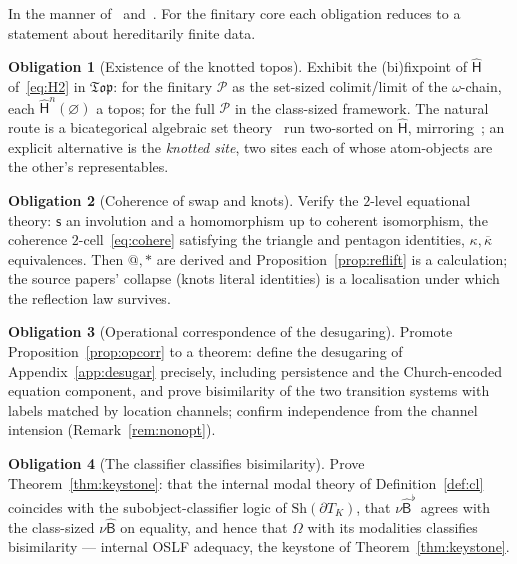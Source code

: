\documentclass[11pt]{article}
\makeatletter
\newcommand{\dT}{\partial T}
\newcommand{\Top}{\mathfrak{Top}}
\newcommand{\Sh}{\mathrm{Sh}}
\newcommand{\Ps}{\mathcal{P}}
\newcommand{\sH}{\widehat{\mathsf{H}}}
\newcommand{\sB}{\widehat{\mathsf{B}}}
\newcommand{\swap}{\mathsf{s}}
\newcommand{\Av}{\Omega}
\newcommand{\quo}[1]{@#1}
\newcommand{\drf}[1]{{*}#1}
\theoremstyle{plain}
\theoremstyle{definition}
\newtheorem{obligation}{Obligation}
\theoremstyle{remark}
\makeatother
\begin{document}
In the manner of~\cite[\S8]{rset} and~\cite[\S8]{knotrho}. For the finitary core each obligation
reduces to a statement about hereditarily finite data.

\begin{obligation}[Existence of the knotted topos]\label{ob:exist}
Exhibit the (bi)fixpoint of $\sH$ of~\eqref{eq:H2} in $\Top$: for the finitary $\Ps$ as the set-sized
colimit/limit of the $\omega$-chain, each $\sH^n(\varnothing)$ a topos; for the full $\Ps$ in the
class-sized framework. The natural route is a bicategorical algebraic set theory~\cite{jm,awodey,elephant}
run two-sorted on $\sH$, mirroring~\cite[\S8.1]{rset}; an explicit alternative is the \emph{knotted
site}, two sites each of whose atom-objects are the other's representables.
\end{obligation}

\begin{obligation}[Coherence of swap and knots]\label{ob:cohere}
Verify the $2$-level equational theory: $\swap$ an involution and a homomorphism up to coherent
isomorphism, the coherence $2$-cell~\eqref{eq:cohere} satisfying the triangle and pentagon identities,
$\kappa,\overline\kappa$ equivalences. Then $\quo{},\drf{}$ are derived and Proposition~\ref{prop:reflift}
is a calculation; the source papers' collapse (knots literal identities) is a localisation under which
the reflection law survives.
\end{obligation}

\begin{obligation}[Operational correspondence of the desugaring]\label{ob:opcorr}
Promote Proposition~\ref{prop:opcorr} to a theorem: define the desugaring of
Appendix~\ref{app:desugar} precisely, including persistence and the Church-encoded equation component,
and prove bisimilarity of the two transition systems with labels matched by location channels; confirm
independence from the channel intension (Remark~\ref{rem:nonopt}).
\end{obligation}

\begin{obligation}[The classifier classifies bisimilarity]\label{ob:classify}
Prove Theorem~\ref{thm:keystone}: that the internal modal theory of Definition~\ref{def:cl} coincides
with the subobject-classifier logic of $\Sh(\dT_K)$, that $\nu\sB^\flat$ agrees with the class-sized
$\nu\sB$ on equality, and hence that $\Av$ with its modalities classifies bisimilarity --- internal
OSLF adequacy, the keystone of Theorem~\ref{thm:keystone}.
\end{obligation}
\end{document}
